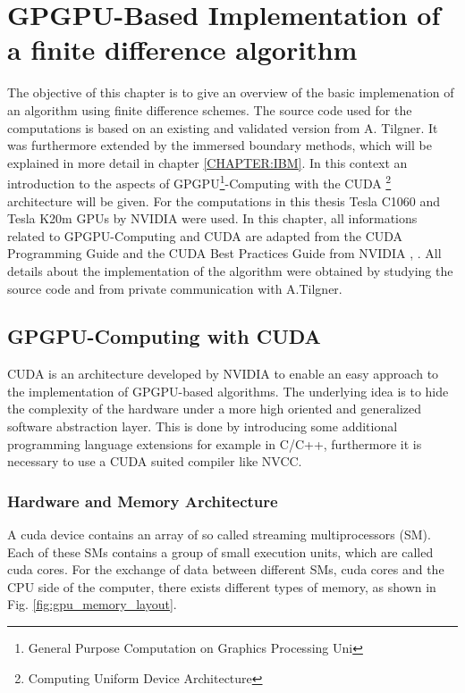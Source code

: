 \chapter[ GPGPU-Based Implementation of a finite difference algorithm]{GPGPU-Based Implementation of \\ a finite difference algorithm}

\label{CHAPTER:CUDA}

The objective of this chapter is to give an overview of the basic implemenation of an algorithm using finite difference schemes.
The source code used for the computations is based on an existing and validated version from A. Tilgner.
It was furthermore extended by the immersed boundary methods, which will be explained in more detail in chapter \ref{CHAPTER:IBM}.
In this context an introduction to the aspects of GPGPU\footnote{General Purpose Computation on Graphics Processing Uni}-Computing
with the CUDA \footnote{Computing Uniform Device Architecture} architecture will be given.
For the computations in this thesis Tesla C1060 and Tesla K20m GPUs by NVIDIA were used.%
In this chapter, all informations related to GPGPU-Computing and CUDA are adapted from the CUDA Programming Guide and the CUDA Best Practices Guide from NVIDIA
\citep{CUDAPG}, \citep{CUDABP}. All details about the implementation of the algorithm were obtained by studying the source code
and from private communication with A.Tilgner.

\section{GPGPU-Computing with CUDA}

CUDA is an architecture developed by NVIDIA to enable an easy approach to the implementation of GPGPU-based algorithms.
The underlying idea is to hide the complexity of the hardware under a more high oriented and generalized software abstraction layer.
This is done by introducing some additional programming language extensions for example in C/C++,
furthermore it is necessary to use a CUDA suited compiler like NVCC.

\subsection{Hardware and Memory Architecture}

A cuda device contains an array of so called streaming multiprocessors (SM).
Each of these SMs contains a group of small execution units, which are called cuda cores.
For the exchange of data between different SMs, cuda cores and the CPU side of the computer, there exists different
types of memory, as shown  in Fig.  \ref{fig:gpu_memory_layout}.
\newpage


